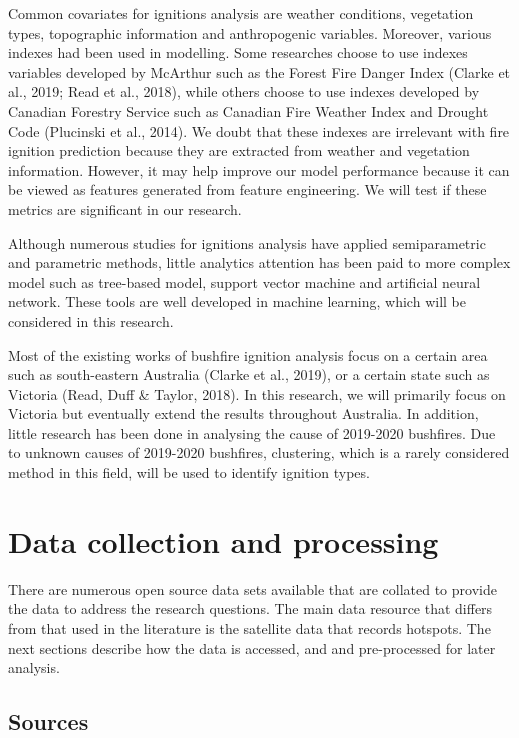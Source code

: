 \documentclass{monashthesis}
\begin{document}
Common covariates for ignitions analysis are weather conditions,
vegetation types, topographic information and anthropogenic variables.
Moreover, various indexes had been used in modelling. Some researches
choose to use indexes variables developed by McArthur such as the Forest
Fire Danger Index (Clarke et al., 2019; Read et al., 2018), while others
choose to use indexes developed by Canadian Forestry Service such as
Canadian Fire Weather Index and Drought Code (Plucinski et al., 2014).
We doubt that these indexes are irrelevant with fire ignition prediction
because they are extracted from weather and vegetation information.
However, it may help improve our model performance because it can be
viewed as features generated from feature engineering. We will test if
these metrics are significant in our research.

Although numerous studies for ignitions analysis have applied
semiparametric and parametric methods, little analytics attention has
been paid to more complex model such as tree-based model, support vector
machine and artificial neural network. These tools are well developed in
machine learning, which will be considered in this research.

Most of the existing works of bushfire ignition analysis focus on a
certain area such as south-eastern Australia (Clarke et al., 2019), or a
certain state such as Victoria (Read, Duff \& Taylor, 2018). In this
research, we will primarily focus on Victoria but eventually extend the
results throughout Australia. In addition, little research has been done
in analysing the cause of 2019-2020 bushfires. Due to unknown causes of
2019-2020 bushfires, clustering, which is a rarely considered method in
this field, will be used to identify ignition types.

\chapter{Data collection and
processing}\label{data-collection-and-processing}

There are numerous open source data sets available that are collated to
provide the data to address the research questions. The main data
resource that differs from that used in the literature is the satellite
data that records hotspots. The next sections describe how the data is
accessed, and and pre-processed for later analysis.

\section{Sources}\label{sources}
\end{document}
